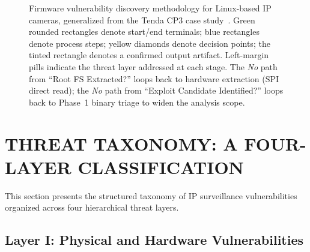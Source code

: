 \documentclass[letterpaper, 10pt, conference]{ieeeconf}
\begin{document}
\begin{figure}[t]

\caption{Firmware vulnerability discovery methodology for Linux-based
IP cameras, generalized from the Tenda CP3 case study~\cite{stabili2024}.
Green rounded rectangles denote start/end terminals; blue rectangles
denote process steps; yellow diamonds denote decision points; the
tinted rectangle denotes a confirmed output artifact. Left-margin pills
indicate the threat layer addressed at each stage. The \textit{No} path
from ``Root FS Extracted?'' loops back to hardware extraction (SPI
direct read); the \textit{No} path from ``Exploit Candidate Identified?''
loops back to Phase~1 binary triage to widen the analysis scope.}
\label{fig:flowchart}
\end{figure}

\section{THREAT TAXONOMY: A FOUR-LAYER CLASSIFICATION}

This section presents the structured taxonomy of IP surveillance
vulnerabilities organized across four hierarchical threat layers.

\subsection{Layer I: Physical and Hardware Vulnerabilities}
\end{document}

